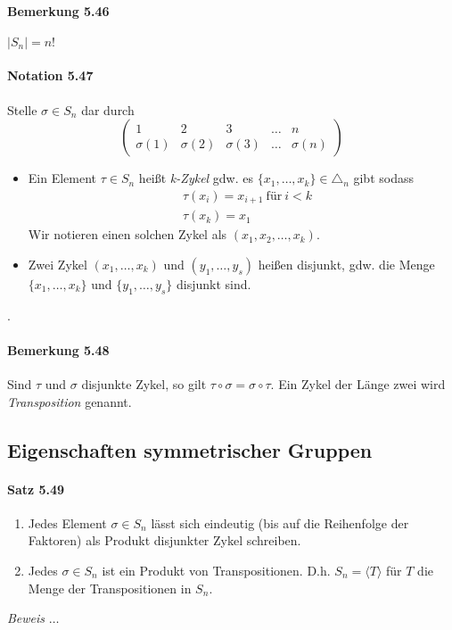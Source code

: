 \documentclass{scrartcl}
\begin{document}
\paragraph{Bemerkung 5.46}
$|S_n| = n!$

\paragraph{Notation 5.47}
Stelle $\sigma \in S_n$ dar durch
\[
  \begin{pmatrix}
    1         & 2         & 3         & \dots & n         \\
    \sigma(1) & \sigma(2) & \sigma(3) & \dots & \sigma(n)
  \end{pmatrix}
\]
\begin{itemize}
\item Ein Element $\tau \in S_n$ heißt \textit{k-Zykel} gdw. es $\{x_1, \dots,
  x_k\} \in \triangle_n$ gibt sodass
  \[
    \begin{matrix}
      &\tau(x_i) = x_{i+1} ~\text{für}~ i < k \\
      &\tau(x_k) = x_1
    \end{matrix}
  \]
  Wir notieren einen solchen Zykel als $(x_1, x_2, \dots, x_k)$.
  \item Zwei Zykel $(x_1, \dots, x_k)$ und $(y_1, \dots, y_s)$ heißen disjunkt,
    gdw. die Menge $\{x_1, \dots, x_k\}$ und $\{y_1, \dots, y_s\}$ disjunkt sind.
\end{itemize}
.

\paragraph{Bemerkung 5.48}
Sind $\tau$ und $\sigma$ disjunkte Zykel, so gilt $\tau \circ \sigma = \sigma
\circ \tau$. Ein Zykel der Länge zwei wird \textit{Transposition} genannt.

\subsection{Eigenschaften symmetrischer Gruppen}
\label{subsec:eigenschaftensymmetrischergruppen}

\paragraph{Satz 5.49}
\begin{enumerate}
\item Jedes Element $\sigma \in S_n$ lässt sich eindeutig (bis auf die
  Reihenfolge der Faktoren) als Produkt disjunkter Zykel schreiben.
\item Jedes $\sigma \in S_n$ ist ein Produkt von Transpositionen. D.h. $S_n =
  \langle {T} \rangle$ für $T$ die Menge der Transpositionen in $S_n$.
\end{enumerate}
\textit{Beweis} $\dots$
\end{document}
